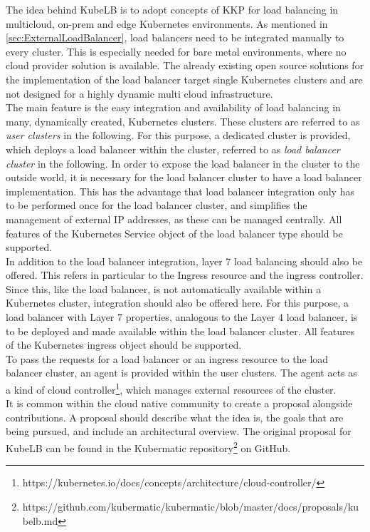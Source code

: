 The idea behind KubeLB is to adopt concepts of KKP for load balancing in multicloud, on-prem and edge Kubernetes environments.
As mentioned in \autoref{sec:ExternalLoadBalancer}, load balancers need to be integrated manually to every cluster.
This is especially needed for bare metal environments, where no cloud provider solution is available.
The already existing open source solutions for the implementation of the load balancer target single Kubernetes clusters and are not designed for a highly dynamic multi cloud infrastructure.
\\
The main feature is the easy integration and availability of load balancing in many, dynamically created, Kubernetes clusters.
These clusters are referred to as \textit{user clusters} in the following.
For this purpose, a dedicated cluster is provided, which deploys a load balancer within the cluster, referred to as \textit{load balancer cluster} in the following.
In order to expose the load balancer in the cluster to the outside world, it is necessary for the load balancer cluster to have a load balancer implementation.
This has the advantage that load balancer integration only has to be performed once for the load balancer cluster, and simplifies the management of external IP addresses, as these can be managed centrally.
All features of the Kubernetes Service object of the load balancer type should be supported.
\\
In addition to the load balancer integration, layer 7 load balancing should also be offered.
This refers in particular to the Ingress resource and the ingress controller.
Since this, like the load balancer, is not automatically available within a Kubernetes cluster, integration should also be offered here.
For this purpose, a load balancer with Layer 7 properties, analogous to the Layer 4 load balancer, is to be deployed and made available within the load balancer cluster.
All features of the Kubernetes ingress object should be supported.
\\
To pass the requests for a load balancer or an ingress resource to the load balancer cluster, an agent is provided within the user clusters.
The agent acts as a kind of cloud controller\footnote{https://kubernetes.io/docs/concepts/architecture/cloud-controller/}, which manages external resources of the cluster.
\\
It is common within the cloud native community to create a proposal alongside contributions.
A proposal should describe what the idea is, the goals that are being pursued, and include an architectural overview.
The original proposal for KubeLB can be found in the Kubermatic repository\footnote{https://github.com/kubermatic/kubermatic/blob/master/docs/proposals/kubelb.md} on GitHub.
